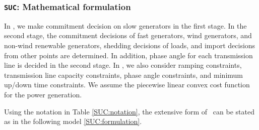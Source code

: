 \subsubsection{\texttt{SUC}: Mathematical formulation}
In \suc, we make commitment decision on slow generators in the first stage. In the second stage, the commitment decisions of fast generators, wind generators, and non-wind renewable generators, shedding decisions of loads, and import decisions from other points are determined. In addition, phase angle for each transmission line is decided in the second stage. In \suc, we also consider ramping constraints, transmission line capacity constraints, phase angle constraints, and minimum up/down time constraints. We assume the piecewise linear convex cost function for the power generation.

Using the notation in Table \ref{SUC:notation}, the extensive form of \suc\ can be stated as in the following model \ref{SUC:formulation}.

